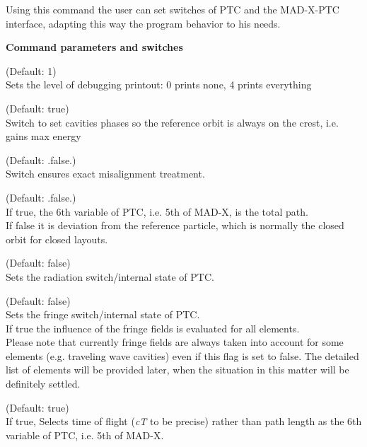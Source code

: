 Using this command the user can set switches of PTC and the MAD-X-PTC
interface, adapting this way the program behavior to his needs.   

{\bf Command parameters and switches}
\begin{madlist}
    (Default: 1)\\
     Sets the level of debugging printout: 0 prints none, 4 prints everything   

    (Default: true)\\
     Switch to set cavities phases so the reference orbit is always on
     the crest, i.e. gains max energy    

    (Default: .false.)\\
     Switch ensures exact misalignment treatment.   

    (Default: .false.)\\
     If true, the 6th variable of PTC, i.e. 5th of MAD-X, is the total
     path.  \\
     If false it is deviation from the reference particle,
     which is normally the closed orbit for closed layouts.    

    (Default: false)\\    
     Sets the radiation switch/internal state of PTC.   

    (Default: false)\\    
     Sets the fringe switch/internal state of PTC. \\ 
     If true the influence of the fringe fields is evaluated for all
     elements. \\       
     Please note that currently fringe fields are always taken into
     account for some elements (e.g. traveling wave cavities) even if
     this flag is set to false. The detailed list of elements
     will be provided later, when the situation in this matter will be
     definitely settled.    

    (Default: true)\\  
     If true, Selects time of flight (\textit{cT} to be precise) rather
     than path length as the 6th variable of PTC, i.e. 5th of MAD-X.     

\end{madlist}


